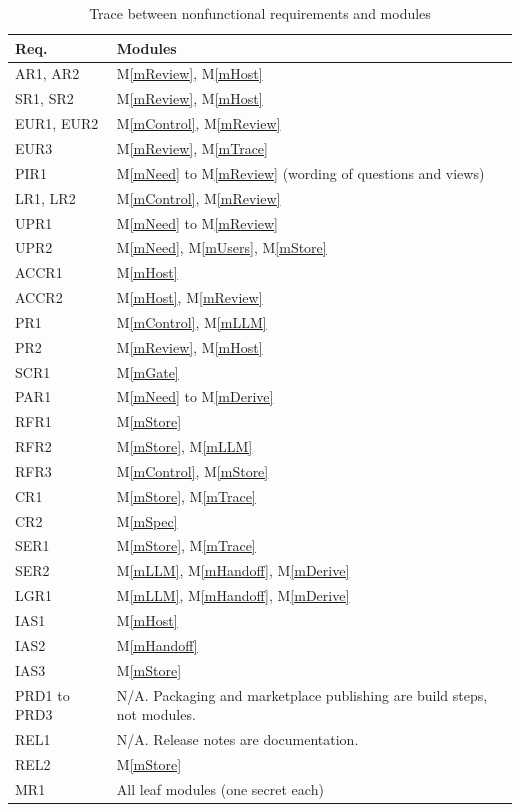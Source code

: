 \documentclass[12pt, titlepage]{article}
\newcommand{\mref}[1]{M\ref{#1}}
\begin{document}
\begin{longtable}{p{} p{}}
\caption{Trace between nonfunctional requirements and modules} \label{TblNFR}\\
\toprule
\textbf{Req.} & \textbf{Modules}\\
\midrule
\endhead
AR1, AR2 & \mref{mReview}, \mref{mHost}\\
SR1, SR2 & \mref{mReview}, \mref{mHost}\\
EUR1, EUR2 & \mref{mControl}, \mref{mReview}\\
EUR3 & \mref{mReview}, \mref{mTrace}\\
PIR1 & \mref{mNeed} to \mref{mReview} (wording of questions and views)\\
LR1, LR2 & \mref{mControl}, \mref{mReview}\\
UPR1 & \mref{mNeed} to \mref{mReview}\\
UPR2 & \mref{mNeed}, \mref{mUsers}, \mref{mStore}\\
ACCR1 & \mref{mHost}\\
ACCR2 & \mref{mHost}, \mref{mReview}\\
PR1 & \mref{mControl}, \mref{mLLM}\\
PR2 & \mref{mReview}, \mref{mHost}\\
SCR1 & \mref{mGate}\\
PAR1 & \mref{mNeed} to \mref{mDerive}\\
RFR1 & \mref{mStore}\\
RFR2 & \mref{mStore}, \mref{mLLM}\\
RFR3 & \mref{mControl}, \mref{mStore}\\
CR1 & \mref{mStore}, \mref{mTrace}\\
CR2 & \mref{mSpec}\\
SER1 & \mref{mStore}, \mref{mTrace}\\
SER2 & \mref{mLLM}, \mref{mHandoff}, \mref{mDerive}\\
LGR1 & \mref{mLLM}, \mref{mHandoff}, \mref{mDerive}\\
IAS1 & \mref{mHost}\\
IAS2 & \mref{mHandoff}\\
IAS3 & \mref{mStore}\\
PRD1 to PRD3 & N/A. Packaging and marketplace publishing are build steps, not
modules.\\
REL1 & N/A. Release notes are documentation.\\
REL2 & \mref{mStore}\\
MR1 & All leaf modules (one secret each)\\

\end{longtable}
\end{document}

